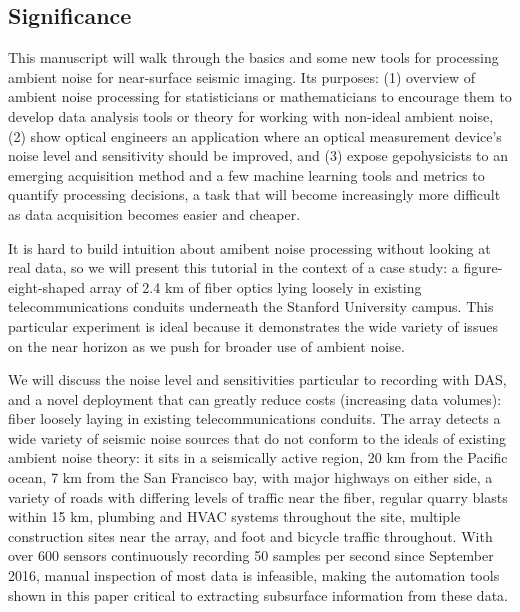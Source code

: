 \documentclass[11pt]{article}
\begin{document}
\subsection*{Significance} 
\vspace{-0.2cm}
This manuscript will walk through the basics and some new tools for processing ambient noise for near-surface seismic imaging. Its purposes: (1) overview of ambient noise processing for statisticians or mathematicians to encourage them to develop data analysis tools or theory for working with non-ideal ambient noise, (2) show optical engineers an application where an optical measurement device's noise level and sensitivity should be improved, and (3) expose gepohysicists to an emerging acquisition method and a few machine learning tools and metrics to quantify processing decisions, a task that will become increasingly more difficult as data acquisition becomes easier and cheaper.
\par 
It is hard to build intuition about amibent noise processing without looking at real data, so we will present this tutorial in the context of a case study: a figure-eight-shaped array of 2.4 km of fiber optics lying loosely in existing telecommunications conduits underneath the Stanford University campus. This particular experiment is ideal because it demonstrates the wide variety of issues on the near horizon as we push for broader use of ambient noise. 
\par
We will discuss the noise level and sensitivities particular to recording with DAS, and a novel deployment that can greatly reduce costs (increasing data volumes): fiber loosely laying in existing telecommunications conduits. The array detects a wide variety of seismic noise sources that do not conform to the ideals of existing ambient noise theory: it sits in a seismically active region, 20 km from the Pacific ocean, 7 km from the San Francisco bay, with major highways on either side, a variety of roads with differing levels of traffic near the fiber, regular quarry blasts within 15 km, plumbing and HVAC systems throughout the site, multiple construction sites near the array, and foot and bicycle traffic throughout. With over 600 sensors continuously recording 50 samples per second since September 2016, manual inspection of most data is infeasible, making the automation tools shown in this paper critical to extracting subsurface information from these data.

\vspace{-0.5cm}
\end{document}
